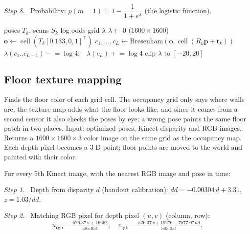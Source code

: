 \documentclass[letterpaper, 10pt, conference]{ieeeconf}
\newcommand{\p}{\mathbf{p}}
\newcommand{\tb}{\mathbf{t}}
\newcommand{\step}[1]{\par\noindent\textit{Step #1.}\ }
\newcommand{\summary}[1]{#1\par}
\begin{document}
\step{8} Probability: $p(m{=}1)=1-\dfrac{1}{1+e^{\lambda}}$ (the logistic function).

\begin{algorithm}[H]
\caption{Occupancy grid}\label{alg:occupancy}
\footnotesize
\begin{algorithmic}[1]
\Require poses $T_k$, scans $S_k$
\Ensure log-odds grid $\lambda$
\State $\lambda\gets0$ ($1600\times1600$)
 
  \State $\mathbf{o}\gets\operatorname{cell}(T_k[0.133,0,1]^\top)$
  \For{each $\p\in S_k$}
    \State $c_1,\dots,c_L\gets\text{Bresenham}(\mathbf{o},\operatorname{cell}(R_k\p+\tb_k))$
    \State $\lambda(c_1..c_{L-1})\mathrel{-}=\log4$;\ \ $\lambda(c_L)\mathrel{+}=\log4$
  \EndFor
  \State clip $\lambda$ to $[-20,20]$
\EndFor
\end{algorithmic}
\end{algorithm}

\subsection{Floor texture mapping}

\summary{Finds the floor color of each grid cell. The occupancy grid only
says where walls are; the texture map adds what the floor looks like, and
since it comes from a second sensor it also checks the poses by eye: a wrong
pose paints the same floor patch in two places. Input: optimized poses,
Kinect disparity and RGB images. Returns a $1600\times1600\times3$ color image
on the same grid as the occupancy map. Each depth pixel becomes a 3-D
point; floor points are moved to the world and painted with their color.}

For every 5th Kinect image, with the nearest RGB image and pose in time:

\step{1} Depth from disparity $d$ (handout calibration):
$dd=-0.00304\,d+3.31$, $z=1.03/dd$.

\step{2} Matching RGB pixel for depth pixel $(u,v)$ (column, row):
\begin{equation}
u_{\text{rgb}}=\tfrac{526.37\,u+16662}{585.051},\quad
v_{\text{rgb}}=\tfrac{526.37\,v+19276-7877.07\,dd}{585.051}.
\end{equation}
\end{document}
